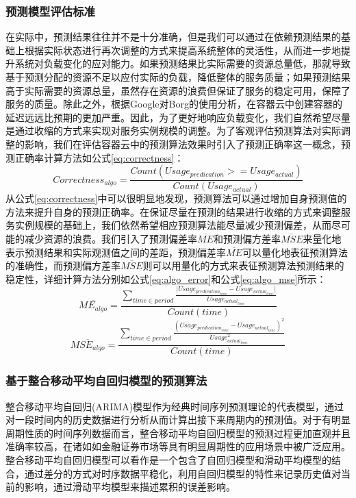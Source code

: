 \subsubsection{预测模型评估标准}
在实际中，预测结果往往并不是十分准确，但是我们可以通过在依赖预测结果的基础上根据实际状态进行再次调整的方式来提高系统整体的灵活性，从而进一步地提升系统对负载变化的应对能力。如果预测结果比实际需要的资源总量低，那就导致基于预测分配的资源不足以应付实际的负载，降低整体的服务质量；如果预测结果高于实际需要的资源总量，虽然存在资源的浪费但保证了服务的稳定可用，保障了服务的质量。除此之外，根据Google对Borg的使用分析，在容器云中创建容器的延迟远远比预期的更加严重\cite{verma2015large}。因此，为了更好地响应负载变化，我们自然希望尽量是通过收缩的方式来实现对服务实例规模的调整。为了客观评估预测算法对实际调整的影响，我们在评估容器云中的预测算法效果时引入了预测正确率这一概念，预测正确率计算方法如公式\ref{eq:correctness}：
\begin{equation}\label{eq:correctness}
Correctness_{algo} = \frac{Count(Usage_{predication} >= Usage_{actual})}{Count(Usage_{actual})}
\end{equation}
从公式\ref{eq:correctness}中可以很明显地发现，预测算法可以通过增加自身预测值的方法来提升自身的预测正确率。在保证尽量在预测的结果进行收缩的方式来调整服务实例规模的基础上，我们依然希望相应预测算法能尽量减少预测偏差，从而尽可能的减少资源的浪费。我们引入了预测偏差率$\overline{ME}$和预测偏方差率$\overline{MSE}$来量化地表示预测结果和实际观测值之间的差距，预测偏差率$\overline{ME}$可以量化地表征预测算法的准确性，而预测偏方差率$\overline{MSE}$则可以用量化的方式来表征预测算法预测结果的稳定性，详细计算方法分别如公式\ref{eq:algo_error}和公式\ref{eq:algo_mse}所示：
\begin{equation}\label{eq:algo_error}
\overline{ME_{algo}} = \frac{\sum_{time \in period} {\frac{\vert Usage_{predication_{time}} - Usage_{actual_{time}}\vert}{Usage_{actual_{time}}}}}{Count(time)}
\end{equation}
\begin{equation}\label{eq:algo_mse}
\overline{MSE_{algo}} = \frac{\sum_{time \in period} {\frac{(Usage_{predication_{time}} - Usage_{actual_{time}})^{2}}{Usage_{actual_{time}}^{2}}}}{Count(time)}
\end{equation}

\subsubsection{基于整合移动平均自回归模型的预测算法}
整合移动平均自回归(ARIMA)模型作为经典时间序列预测理论的代表模型，通过对一段时间内的历史数据进行分析从而计算出接下来周期内的预测值。对于有明显周期性质的时间序列数据而言，整合移动平均自回归模型的预测过程更加直观并且准确率较高，在诸如如金融证券市场等具有明显周期性的应用场景中被广泛应用。整合移动平均自回归模型可以看作是一个包含了自回归模型和滑动平均模型的结合，通过差分的方式对时序数据平稳化，利用自回归模型的特性来记录历史值对当前的影响，通过滑动平均模型来描述累积的误差影响。

